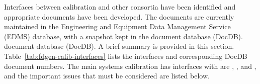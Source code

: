 
Interfaces between calibration and other consortia have been identified and appropriate documents have been developed. %
The documents are currently maintained in the  Engineering and Equipment Data Management Service (EDMS) database, with a  snapshot kept in the  document database (DocDB).
 document database (DocDB). %
A brief summary is provided in this section. Table~\ref{tab:fdgen-calib-interfaces} lists the interfaces and corresponding DocDB document numbers. 
The main systems calibration has interfaces with are , , and , and the important issues that must be considered are listed below.

